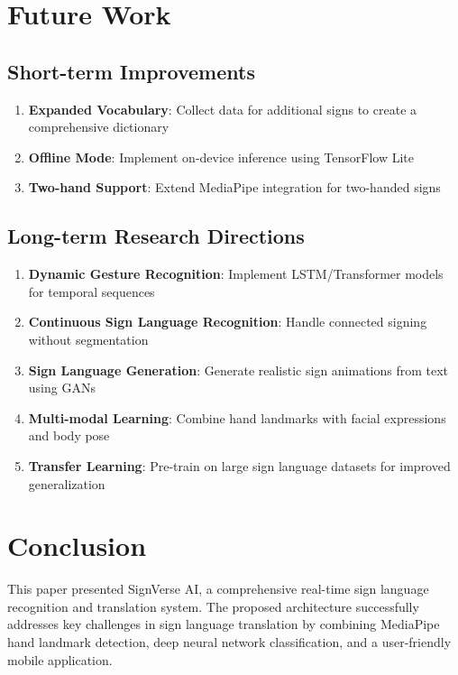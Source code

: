 \documentclass[conference]{IEEEtran}
\begin{document}
\section{Future Work}

\subsection{Short-term Improvements}

\begin{enumerate}
    \item \textbf{Expanded Vocabulary}: Collect data for additional signs to create a comprehensive dictionary
    \item \textbf{Offline Mode}: Implement on-device inference using TensorFlow Lite
    \item \textbf{Two-hand Support}: Extend MediaPipe integration for two-handed signs
\end{enumerate}

\subsection{Long-term Research Directions}

\begin{enumerate}
    \item \textbf{Dynamic Gesture Recognition}: Implement LSTM/Transformer models for temporal sequences
    \item \textbf{Continuous Sign Language Recognition}: Handle connected signing without segmentation
    \item \textbf{Sign Language Generation}: Generate realistic sign animations from text using GANs
    \item \textbf{Multi-modal Learning}: Combine hand landmarks with facial expressions and body pose
    \item \textbf{Transfer Learning}: Pre-train on large sign language datasets for improved generalization
\end{enumerate}

\section{Conclusion}

This paper presented SignVerse AI, a comprehensive real-time sign language recognition and translation system. The proposed architecture successfully addresses key challenges in sign language translation by combining MediaPipe hand landmark detection, deep neural network classification, and a user-friendly mobile application.
\end{document}
